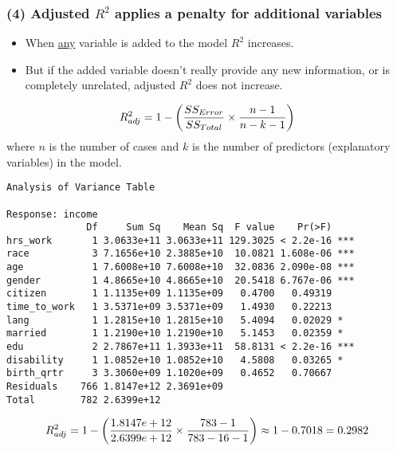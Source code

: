 \documentclass[slidestop,compress,mathserif,12pt,t,professionalfonts,xcolor=table]{beamer}
\begin{document}

\begin{frame}
\frametitle{(4) Adjusted $R^2$ applies a penalty for additional variables}

\begin{itemize}

\item When \underline{any} variable is added to the model $R^2$ increases.

\pause

\item But if the added variable doesn't really provide any new information, or is completely unrelated, adjusted $R^2$ does not increase.

\end{itemize}

\pause

{\[ R^2_{adj} = 1 - \left(  \frac{ SS_{Error} }{ SS_{Total} } \times \frac{n - 1}{n - k - 1}  \right) \]
where $n$ is the number of cases and $k$ is the number of predictors (explanatory variables) in the model.
}

\end{frame}


\begin{frame}[fragile]

{\tiny
\begin{Verbatim}[frame=single, formatcom=\color{gray}]
Analysis of Variance Table

Response: income
              Df     Sum Sq    Mean Sq  F value    Pr(>F)    
hrs_work       1 3.0633e+11 3.0633e+11 129.3025 < 2.2e-16 ***
race           3 7.1656e+10 2.3885e+10  10.0821 1.608e-06 ***
age            1 7.6008e+10 7.6008e+10  32.0836 2.090e-08 ***
gender         1 4.8665e+10 4.8665e+10  20.5418 6.767e-06 ***
citizen        1 1.1135e+09 1.1135e+09   0.4700   0.49319    
time_to_work   1 3.5371e+09 3.5371e+09   1.4930   0.22213    
lang           1 1.2815e+10 1.2815e+10   5.4094   0.02029 *  
married        1 1.2190e+10 1.2190e+10   5.1453   0.02359 *  
edu            2 2.7867e+11 1.3933e+11  58.8131 < 2.2e-16 ***
disability     1 1.0852e+10 1.0852e+10   4.5808   0.03265 *  
birth_qrtr     3 3.3060e+09 1.1020e+09   0.4652   0.70667    
Residuals    766 1.8147e+12 2.3691e+09          
Total        782 2.6399e+12             
\end{Verbatim}
}

\[ R^2_{adj} = 1 - \left(  \frac{1.8147e+12}{ 2.6399e+12 } \times \frac{783 - 1}{783 - 16 - 1}  \right) \approx 1 - 0.7018 = 0.2982 \]

\end{frame}
\end{document}
